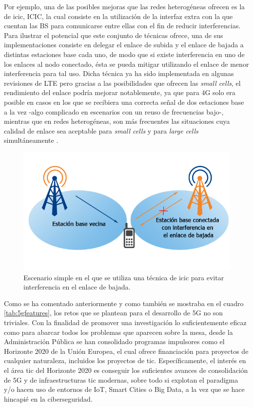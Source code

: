Por ejemplo, una de las posibles mejoras que las redes heterogéneas ofrecen es la de \acl{icic}, ICIC, la cual consiste en la utilización de la interfaz extra con la que cuentan las BS para comunicarse entre ellas con el fin  de reducir interferencias. Para ilustrar el potencial que este conjunto de técnicas ofrece, una de sus implementaciones consiste en delegar el enlace de subida y el enlace de bajada a distintas estaciones base cada uno, de modo que si existe interferencia en uno de los enlaces al nodo conectado, ésta se pueda mitigar utilizando el enlace de menor interferencia para tal uso. Dicha técnica ya ha sido implementada en algunas revisiones de LTE pero gracias a las posibilidades que ofrecen las \textit{small cells}, el rendimiento del enlace podría mejorar notablemente, ya que para 4G solo era posible en casos en los que se recibiera una correcta señal de dos estaciones base a la vez -algo complicado en escenarios con un reuso de frecuencias bajo-, mientras que en redes heterogéneas, son más frecuentes las situaciones cuya calidad de enlace sea aceptable para \textit{small cells} y para \textit{large cells} simultáneamente \cite{ieeeicic}. 

\begin{figure}[!hb]
	\centering
    \includegraphics[width=0.75\linewidth]{imagenes/icic.png}
	\caption{Escenario simple en el que se utiliza una técnica de \acs{icic} para evitar interferencia en el enlace de bajada.}
	\label{fig:icic}
\end{figure}

Como se ha comentado anteriormente y como también se mostraba en el cuadro \ref{tab:5gfeatures}, los retos que se plantean para el desarrollo de 5G no son triviales. Con la finalidad de promover una investigación lo suficientemente eficaz como para abarcar todos los problemas que aparecen sobre la mesa, desde la Administración Pública se han consolidado programas impulsores como el Horizonte 2020 de la Unión Europea, el cual ofrece financiación para proyectos de cualquier naturaleza, incluidos los proyectos de \ac{tic}. Específicamente, el interés en el área \acs{tic} del Horizonte 2020 es conseguir los suficientes avances de consolidación de 5G y de infraestructuras \acs{tic} modernas, sobre todo si explotan el paradigma y/o hacen uso de entornos de IoT, Smart Cities o Big Data, a la vez que se hace hincapié en la ciberseguridad.

